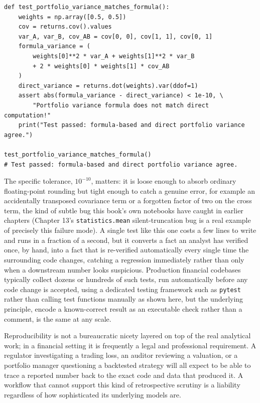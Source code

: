 \documentclass[../ai_in_finance]{subfiles}
\begin{document}
\begin{verbatim}
def test_portfolio_variance_matches_formula():
    weights = np.array([0.5, 0.5])
    cov = returns.cov().values
    var_A, var_B, cov_AB = cov[0, 0], cov[1, 1], cov[0, 1]
    formula_variance = (
        weights[0]**2 * var_A + weights[1]**2 * var_B
        + 2 * weights[0] * weights[1] * cov_AB
    )
    direct_variance = returns.dot(weights).var(ddof=1)
    assert abs(formula_variance - direct_variance) < 1e-10, \
        "Portfolio variance formula does not match direct computation!"
    print("Test passed: formula-based and direct portfolio variance agree.")

test_portfolio_variance_matches_formula()
# Test passed: formula-based and direct portfolio variance agree.
\end{verbatim}

The specific tolerance, $10^{-10}$, matters: it is loose enough to absorb ordinary floating-point rounding but tight enough to catch a genuine error, for example an accidentally transposed covariance term or a forgotten factor of two on the cross term, the kind of subtle bug this book's own notebooks have caught in earlier chapters (Chapter 13's \texttt{statistics.mean} silent-truncation bug is a real example of precisely this failure mode).
A single test like this one costs a few lines to write and runs in a fraction of a second, but it converts a fact an analyst has verified once, by hand, into a fact that is re-verified automatically every single time the surrounding code changes, catching a regression immediately rather than only when a downstream number looks suspicious.
Production financial codebases typically collect dozens or hundreds of such tests, run automatically before any code change is accepted, using a dedicated testing framework such as \texttt{pytest} rather than calling test functions manually as shown here, but the underlying principle, encode a known-correct result as an executable check rather than a comment, is the same at any scale.

Reproducibility is not a bureaucratic nicety layered on top of the real analytical work; in a financial setting it is frequently a legal and professional requirement. A regulator investigating a trading loss, an auditor reviewing a valuation, or a portfolio manager questioning a backtested strategy will all expect to be able to trace a reported number back to the exact code and data that produced it. A workflow that cannot support this kind of retrospective scrutiny is a liability regardless of how sophisticated its underlying models are.
\end{document}
